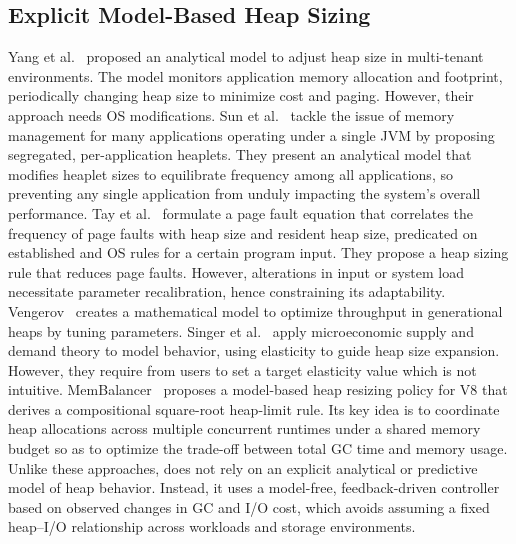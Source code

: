 \subsection{Explicit Model-Based Heap Sizing}
Yang et al.~\cite{yang:real_mem} proposed an analytical model to adjust heap size in multi-tenant environments.
The model monitors application memory allocation and footprint, periodically changing heap size to minimize \flexheapGC{} cost and paging.
However, their approach needs OS modifications.
%
Sun et al.~\cite{sun:multi_space_heap} tackle the issue of memory management for many applications operating under a single JVM by proposing segregated, per-application heaplets.
They present an analytical model that modifies heaplet sizes to equilibrate \flexheapGC{} frequency among all applications, so preventing any single application from unduly impacting the system's overall performance.
%
Tay et al.~\cite{tay:page_fault} formulate a page fault equation that correlates the frequency of page faults with heap size and resident heap size, predicated on established \flexheapGC{} and OS rules for a certain program input.
They propose a heap sizing rule that reduces page faults.
However, alterations in input or system load necessitate parameter recalibration, hence constraining its adaptability.
%
Vengerov~\cite{vengerov:gc_analysis} creates a mathematical model to optimize throughput in generational heaps by tuning \flexheapGC{} parameters.
%
Singer et al.~\cite{singer:economics} apply microeconomic supply and demand theory to model \flexheapGC{} behavior, using elasticity to guide heap size expansion.
However, they require from users to set a target elasticity value which is not intuitive.
%
MemBalancer~\cite{kirisame:membalancer} proposes a model-based heap resizing policy for V8 that derives a compositional square-root heap-limit rule.
Its key idea is to coordinate heap allocations across multiple concurrent runtimes under a shared memory budget so as to optimize the trade-off between total GC time and memory usage.
%
Unlike these approaches, \flexheapName{} does not rely on an explicit analytical or predictive model of heap behavior.
Instead, it uses a model-free, feedback-driven controller based on observed changes in GC and I/O cost, which avoids assuming a fixed heap--I/O relationship across workloads and storage environments.

